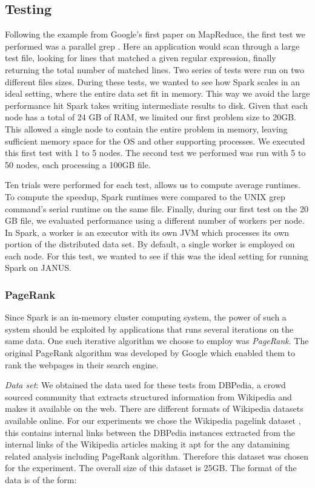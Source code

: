 \documentclass{article}
\begin{document}
\subsection{Testing}
Following the example from Google's first paper on MapReduce, the first test we
performed was a parallel grep \citep{dean-mapreduce}. Here an application would
scan through a large test file, looking for lines that matched a given regular
expression, finally returning the total number of matched lines. Two series of
tests were run on two different files sizes. During these tests, we wanted to
see how Spark scales in an ideal setting, where the entire data set fit in
memory. This way we avoid the large performance hit Spark takes writing
intermediate results to disk. Given that each node has a total of 24 GB of RAM,
we limited our first problem size to 20GB. This allowed a single node to
contain the entire problem in memory, leaving sufficient memory space for the
OS and other supporting processes. We executed this first test with 1 to 5
nodes. The second test we performed was run with 5 to 50 nodes, each processing
a 100GB file.

Ten trials were performed for each test, allows us to compute average
runtimes. To compute the speedup, Spark runtimes were compared to the UNIX grep
command's serial runtime on the same file. Finally, during our first test on the
20 GB file, we evaluated performance using a different number of workers per
node. In Spark, a worker is an executor with its own JVM which processes its
own portion of the distributed data set. By default, a single worker is
employed on each node. For this test, we wanted to see if this was the ideal
setting for running Spark on JANUS.


\subsubsection{PageRank}   
Since Spark is an in-memory cluster computing system, the power of such
a system should be exploited by applications that runs several iterations on
the same data.  One such iterative algorithm we choose to employ was
\emph{PageRank}.  The original PageRank algorithm was developed by Google which
enabled them to rank the webpages in their search engine.

\emph{Data set}:
We obtained the data used for these tests from DBPedia, a crowd sourced
community that extracts structured information from Wikipedia and makes it
available on the web. \citep{[??]} There are different formats of Wikipedia
datasets available online. For our experiments we chose the Wikipedia pagelink
dataset \citep{[??]} , this contains internal links between the DBPedia
instances extracted from the internal links of the Wikipedia articles making it
apt for the any datamining related analysis including PageRank algorithm.
Therefore this dataset was chosen for the experiment.  The overall size of this
dataset is 25GB.  The format of the data is of the form: \\
\end{document}
